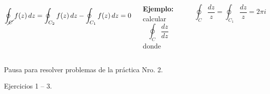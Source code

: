\documentclass[9pt, aspectratio=169]{beamer}
\begin{document}
\begin{frame}
\begin{columns}[t]
 \cx
 \[\oint_{\cancel{C}} f(z) \, dz = \oint_{C_2} f(z) \, dz - \oint_{C_1} f(z) \, dz = 0 \]

 \textbf{Ejemplo:} calcular
 \[ \oint_C \frac{dz}{dz} \]
 donde
  \begin{center}
      \includegraphics[scale=0.40]{figs/fig-05.pdf}
  \end{center}

  \[ \oint_C \frac{dz}{z} = \oint_{C_1} \frac{dz}{z} = 2 \pi i \]

\end{columns}
\end{frame}

\begin{frame}[standout]
    \begin{center}
        Pausa para resolver problemas de la práctica Nro. 2.

        Ejercicios 1 -- 3. 
    \end{center}
\end{frame}
\end{document}
